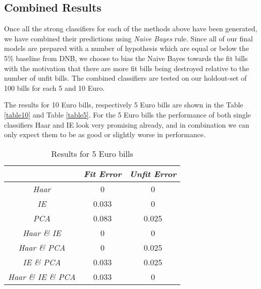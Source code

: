 \documentclass[11pt,twocolumn]{article}
\begin{document}
					
		\subsection{Combined Results}\label{sec:comb_results}
			Once all the strong classifiers for each of the methods above have been generated, we have combined their predictions using \emph{Naive Bayes} rule. Since all of our final models are prepared with a number of hypothesis which are equal or below the 5\% baseline from DNB, we choose to bias the Naive Bayes towards the fit bills with the motivation that there are more fit bills being destroyed relative to the number of unfit bills. The combined classifiers are tested on our holdout-set of 100 bills for each 5 and 10 Euro.

			The results for 10 Euro bills, respectively 5 Euro bills are shown in the Table \ref{table10} and Table \ref{table5}. For the 5 Euro bills the performance of both single classifiers Haar and IE look very promising already, and in combination we can only expect them to be as good or slightly worse in performance.

			\begin{table}[!htbp]
				\caption{Results for 5 Euro bills}
				\selectfont\small
				\label{table5}
				\centering 
				\begin{tabular}{ | c | c | c|}
					\hline\hline & \emph{Fit Error} & \emph{Unfit Error} \\ [0.5ex]\hline 
					\emph{Haar} & 0 & 0 \\ [0.5ex]\hline
					\emph{IE} & 0.033 & 0 \\ [0.5ex]\hline
					\emph{PCA} & 0.083 & 0.025 \\ [0.5ex]\hline
					\emph{Haar \& IE} & 0 & 0 \\ [0.5ex]\hline
					\emph{Haar \& PCA} & 0 & 0.025 \\ [0.5ex]\hline
					\emph{IE \& PCA} & 0.033 & 0.025 \\ [0.5ex]\hline
					\emph{Haar \& IE \& PCA} & 0.033 & 0 \\ [0.5ex]\hline
				\end{tabular}
				\label{table:nonlin5eur} 
			\end{table}
\end{document}
